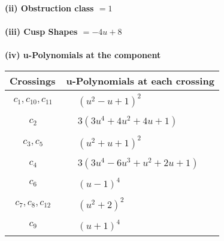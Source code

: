 \documentclass[1p]{elsarticle_modified}
\theoremstyle{definition}
\begin{document}
\flushleft \textbf{(ii) Obstruction class $= 1$}\\~\\
\flushleft \textbf{(iii) Cusp Shapes $= -4 u+8$}\\~\\
\newpage\renewcommand{\arraystretch}{1}
\flushleft \textbf{(iv) u-Polynomials at the component}\newline \\
\begin{tabular}{m{50pt}|m{274pt}}
Crossings & \hspace{64pt}u-Polynomials at each crossing \\
\hline $$\begin{aligned}c_{1},c_{10},c_{11}\end{aligned}$$&$\begin{aligned}
&(u^2- u+1)^2
\end{aligned}$\\
\hline $$\begin{aligned}c_{2}\end{aligned}$$&$\begin{aligned}
&3(3 u^4+4 u^2+4 u+1)
\end{aligned}$\\
\hline $$\begin{aligned}c_{3},c_{5}\end{aligned}$$&$\begin{aligned}
&(u^2+u+1)^2
\end{aligned}$\\
\hline $$\begin{aligned}c_{4}\end{aligned}$$&$\begin{aligned}
&3(3 u^4-6 u^3+u^2+2 u+1)
\end{aligned}$\\
\hline $$\begin{aligned}c_{6}\end{aligned}$$&$\begin{aligned}
&(u-1)^4
\end{aligned}$\\
\hline $$\begin{aligned}c_{7},c_{8},c_{12}\end{aligned}$$&$\begin{aligned}
&(u^2+2)^2
\end{aligned}$\\
\hline $$\begin{aligned}c_{9}\end{aligned}$$&$\begin{aligned}
&(u+1)^4
\end{aligned}$\\
\hline
\end{tabular}\\~\\
\end{document}
